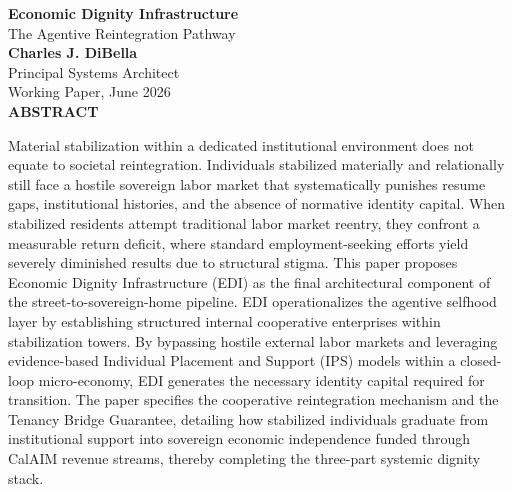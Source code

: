 \documentclass[12pt, letterpaper]{article}
\begin{document}
\captionsetup[table]{labelfont=normalfont, labelsep=period, skip=6pt}

\begin{titlepage}
\begin{center}
{\LARGE \textbf{Economic Dignity Infrastructure}}\\[6pt]
{\large The Agentive Reintegration Pathway}\\[0.5cm]
{\normalsize \textbf{Charles J. DiBella}}\\[0.01cm]
{\normalsize Principal Systems Architect}\\[0.01cm]
{\normalsize Working Paper, June 2026}\\[0.3cm]
\textbf{ABSTRACT}
\vspace{0.2cm}
\end{center}
\begin{minipage}{0.95\textwidth}
\noindent

Material stabilization within a dedicated institutional environment does not equate to societal reintegration. Individuals stabilized materially and relationally still face a hostile sovereign labor market that systematically punishes resume gaps, institutional histories, and the absence of normative identity capital. When stabilized residents attempt traditional labor market reentry, they confront a measurable return deficit, where standard employment-seeking efforts yield severely diminished results due to structural stigma. This paper proposes Economic Dignity Infrastructure (EDI) as the final architectural component of the street-to-sovereign-home pipeline. EDI operationalizes the agentive selfhood layer by establishing structured internal cooperative enterprises within stabilization towers. By bypassing hostile external labor markets and leveraging evidence-based Individual Placement and Support (IPS) models within a closed-loop micro-economy, EDI generates the necessary identity capital required for transition. The paper specifies the cooperative reintegration mechanism and the Tenancy Bridge Guarantee, detailing how stabilized individuals graduate from institutional support into sovereign economic independence funded through CalAIM revenue streams, thereby completing the three-part systemic dignity stack.

\end{minipage}
\end{titlepage}


\newpage
\end{document}

